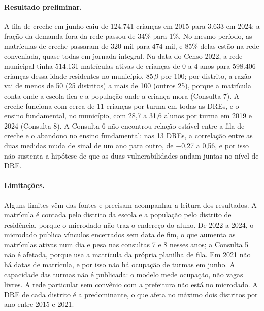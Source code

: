 \documentclass[11pt,a4paper]{article}
\begin{document}
\paragraph{Resultado preliminar.} A fila de creche em junho caiu de 124.741 crianças em 2015 para 3.633 em 2024; a fração da demanda fora da rede passou de 34\% para 1\%. No mesmo período, as matrículas de creche passaram de 320 mil para 474 mil, e 85\% delas estão na rede conveniada, quase todas em jornada integral. Na data do Censo 2022, a rede municipal tinha 514.131 matrículas ativas de crianças de 0 a 4 anos para 598.406 crianças dessa idade residentes no município, 85,9 por 100; por distrito, a razão vai de menos de 50 (25 distritos) a mais de 100 (outros 25), porque a matrícula conta onde a escola fica e a população onde a criança mora (Consulta 7). A creche funciona com cerca de 11 crianças por turma em todas as DREs, e o ensino fundamental, no município, com 28,7 a 31,6 alunos por turma em 2019 e 2024 (Consulta 8). A Consulta 6 não encontrou relação estável entre a fila de creche e o abandono no ensino fundamental: nas 13 DREs, a correlação entre as duas medidas muda de sinal de um ano para outro, de $-$0,27 a 0,56, e por isso não sustenta a hipótese de que as duas vulnerabilidades andam juntas no nível de DRE.

\paragraph{Limitações.} Alguns limites vêm das fontes e precisam acompanhar a leitura dos resultados. A matrícula é contada pelo distrito da escola e a população pelo distrito de residência, porque o microdado não traz o endereço do aluno. De 2022 a 2024, o microdado publica vínculos encerrados sem data de fim, o que aumenta as matrículas ativas num dia e pesa nas consultas 7 e 8 nesses anos; a Consulta 5 não é afetada, porque usa a matrícula da própria planilha de fila. Em 2021 não há datas de matrícula, e por isso não há ocupação de turmas em junho. A capacidade das turmas não é publicada: o modelo mede ocupação, não vagas livres. A rede particular sem convênio com a prefeitura não está no microdado. A DRE de cada distrito é a predominante, o que afeta no máximo dois distritos por ano entre 2015 e 2021.
\end{document}
